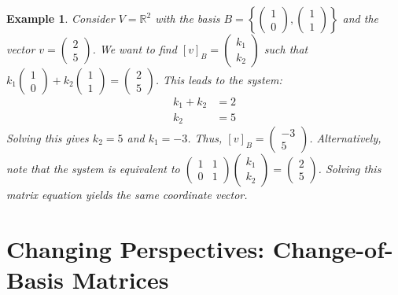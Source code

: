 \documentclass[11pt, a4paper]{article}
\theoremstyle{mydefinitionstyle}
\newtheorem{example}{Example}[section]
\theoremstyle{mytheoremstyle}
\newcommand{\R}{\mathbb{R}}
\begin{document}
\begin{example} \label{ex:coordinates}
    Consider $V = \R^2$ with the basis $B = \left\{ \begin{pmatrix} 1 \\ 0 \end{pmatrix}, \begin{pmatrix} 1 \\ 1 \end{pmatrix} \right\}$ and the vector $v = \begin{pmatrix} 2 \\ 5 \end{pmatrix}$. We want to find $[v]_B = \begin{pmatrix} k_1 \\ k_2 \end{pmatrix}$ such that $k_1 \begin{pmatrix} 1 \\ 0 \end{pmatrix} + k_2 \begin{pmatrix} 1 \\ 1 \end{pmatrix} = \begin{pmatrix} 2 \\ 5 \end{pmatrix}$. This leads to the system:
    \begin{align*} k_1 + k_2 &= 2 \\ k_2 &= 5 \end{align*}
    Solving this gives $k_2 = 5$ and $k_1 = -3$. Thus, $[v]_B = \begin{pmatrix} -3 \\ 5 \end{pmatrix}$.
    Alternatively, note that the system is equivalent to $\begin{pmatrix} 1 & 1 \\ 0 & 1 \end{pmatrix} \begin{pmatrix} k_1 \\ k_2 \end{pmatrix} = \begin{pmatrix} 2 \\ 5 \end{pmatrix}$. Solving this matrix equation yields the same coordinate vector.
\end{example}

\section{Changing Perspectives: Change-of-Basis Matrices}
\end{document}
